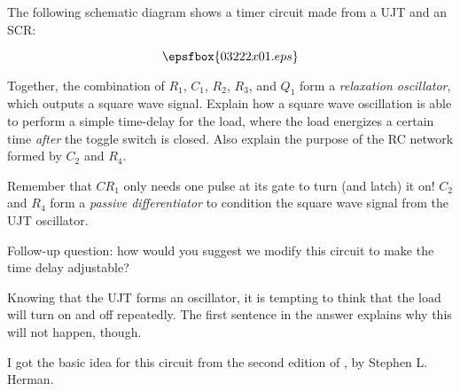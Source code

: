 

The following schematic diagram shows a timer circuit made from a UJT and an SCR:

$$\epsfbox{03222x01.eps}$$

Together, the combination of $R_1$, $C_1$, $R_2$, $R_3$, and $Q_1$ form a {\it relaxation oscillator}, which outputs a square wave signal.  Explain how a square wave oscillation is able to perform a simple time-delay for the load, where the load energizes a certain time {\it after} the toggle switch is closed.  Also explain the purpose of the RC network formed by $C_2$ and $R_4$.







Remember that $CR_1$ only needs one pulse at its gate to turn (and latch) it on!  $C_2$ and $R_4$ form a {\it passive differentiator} to condition the square wave signal from the UJT oscillator.

\vskip 10pt

Follow-up question: how would you suggest we modify this circuit to make the time delay adjustable?







Knowing that the UJT forms an oscillator, it is tempting to think that the load will turn on and off repeatedly.  The first sentence in the answer explains why this will not happen, though.

I got the basic idea for this circuit from the second edition of , by Stephen L. Herman.




